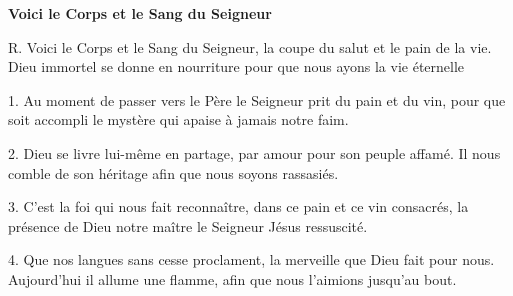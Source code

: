 \textbf{Voici le Corps et le Sang du Seigneur}

R. Voici le Corps et le Sang du Seigneur, la coupe du salut et le pain de la vie. Dieu immortel se donne en nourriture pour que nous ayons la vie éternelle

1. Au moment de passer vers le Père le Seigneur prit du pain et du vin,
pour que soit accompli le mystère qui apaise à jamais notre faim.

2. Dieu se livre lui-même en partage, par amour pour son peuple affamé.
Il nous comble de son héritage afin que nous soyons rassasiés.

3. C'est la foi qui nous fait reconnaître, dans ce pain et ce vin consacrés,
la présence de Dieu notre maître le Seigneur Jésus ressuscité.

4. Que nos langues sans cesse proclament, la merveille que Dieu fait pour nous.
Aujourd'hui il allume une flamme,  afin que nous l'aimions jusqu'au bout.
